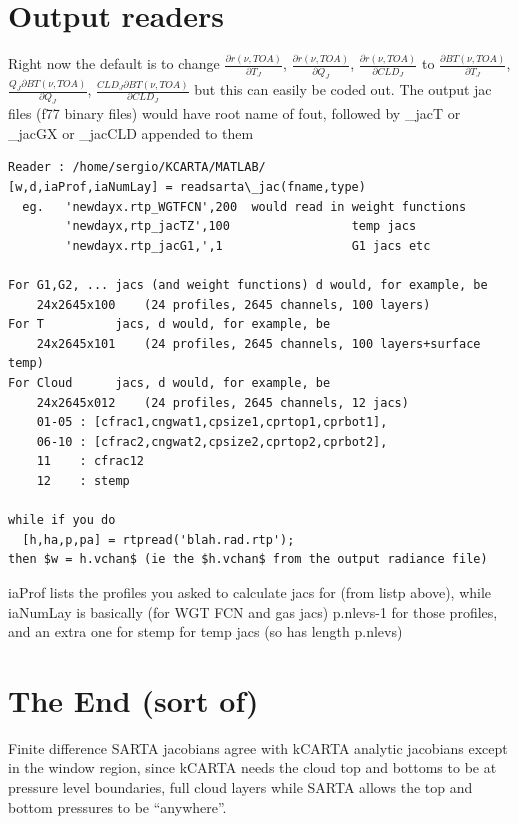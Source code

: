 \documentclass[11pt]{article}
\newcommand{\kc}{\textsf{kCARTA}\xspace}
\newcommand{\sa}{\textsf{SARTA}\xspace}
\begin{document}
\section{Output readers}
Right now the default is to change $\frac{\partial
  r(\nu,TOA)}{\partial T_J}$, $\frac{\partial r(\nu,TOA)}{\partial
  Q_J}$, $\frac{\partial r(\nu,TOA)}{\partial CLD_J}$ to
$\frac{\partial BT(\nu,TOA)}{\partial T_J}$, $\frac{Q_J \partial
  BT(\nu,TOA)}{\partial Q_J}$, $\frac{CLD_J \partial
  BT(\nu,TOA)}{\partial CLD_J}$ but this can easily be coded out. The
output jac files (f77 binary files) would have root name of fout,
followed by \_jacT or \_jacGX or \_jacCLD appended to them

\begin{verbatim}
Reader : /home/sergio/KCARTA/MATLAB/
[w,d,iaProf,iaNumLay] = readsarta\_jac(fname,type)
  eg.   'newdayx.rtp_WGTFCN',200  would read in weight functions
        'newdayx,rtp_jacTZ',100                 temp jacs 
        'newdayx.rtp_jacG1,',1                  G1 jacs etc

For G1,G2, ... jacs (and weight functions) d would, for example, be
    24x2645x100    (24 profiles, 2645 channels, 100 layers)
For T          jacs, d would, for example, be
    24x2645x101    (24 profiles, 2645 channels, 100 layers+surface temp)
For Cloud      jacs, d would, for example, be
    24x2645x012    (24 profiles, 2645 channels, 12 jacs)
    01-05 : [cfrac1,cngwat1,cpsize1,cprtop1,cprbot1],
    06-10 : [cfrac2,cngwat2,cpsize2,cprtop2,cprbot2],
    11    : cfrac12
    12    : stemp 

while if you do
  [h,ha,p,pa] = rtpread('blah.rad.rtp');
then $w = h.vchan$ (ie the $h.vchan$ from the output radiance file)
\end{verbatim} 

iaProf lists the profiles you asked to calculate jacs for (from listp
above), while iaNumLay is basically (for WGT FCN and gas jacs)
p.nlevs-1 for those profiles, and an extra one for stemp for temp jacs
(so has length p.nlevs)

\section{The End (sort of)}

Finite difference \sa jacobians agree with kCARTA analytic jacobians
except in the window region, since \kc needs the cloud top and bottoms
to be at pressure level boundaries, full cloud layers while \sa allows
the top and bottom pressures to be ``anywhere''. 
\end{document}
